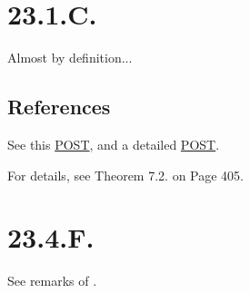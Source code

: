 \section{23.1.C.}

Almost by definition... 

\subsection{References}

See this \href{https://math.stackexchange.com/questions/16310/what-is-the-tor-functor}{POST}, and a detailed \href{https://math.stackexchange.com/questions/2251304/the-definition-of-torsion-functor}{POST}.

For details, see \cite{rotman2009introduction} Theorem 7.2. on Page 405.

\section{23.4.F.}

See remarks of . 